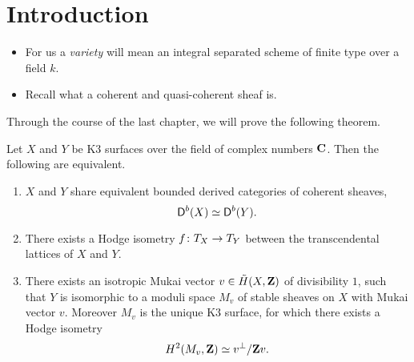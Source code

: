 \section*{Introduction}


\vspace{3cm}

\begin{itemize}
    \item{For us a \emph{variety} will mean an integral separated scheme of finite type over a field $k$. }
    \item{Recall what a coherent and quasi-coherent sheaf is. } 
\end{itemize}

Through the course of the last chapter, we will prove the following theorem. 

\begin{theorem*}
    Let $X$ and $Y$ be K3 surfaces over the field of complex numbers $\mathbf C$. Then the following are equivalent.
    \begin{enumerate}[label = (\roman*)]
        \item{$X$ and $Y$ share equivalent bounded derived categories of coherent sheaves, 
        \[
            \mathsf{D}^b(X) \simeq \mathsf{D}^b(Y).
        \]
        }
        \item{There exists a Hodge isometry $f \colon T_{X} \to T_{Y}$ between the transcendental lattices of $X$ and $Y$.}
        \item{There exists 
        an isotropic Mukai vector $v \in \,\tilde{\!{H}}(X, \mathbf Z)$ of divisibility $1$,
        such that $Y$ is isomorphic to a moduli space $M_v$ of stable sheaves on $X$ with Mukai vector $v$. Moreover $M_v$ is the unique K3 surface, for which there exists a Hodge isometry
        \[
            H^{2}(M_v, \mathbf Z) \simeq v^\perp / \mathbf Z v.
        \]
        }
    \end{enumerate}
\end{theorem*}
